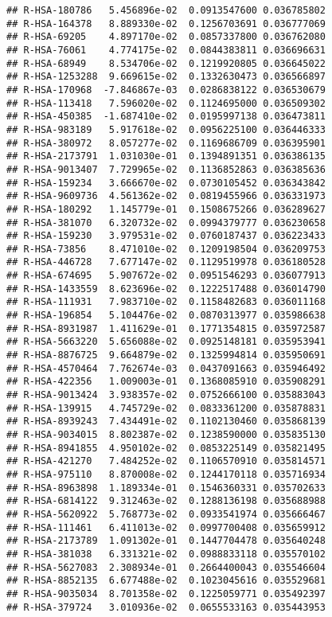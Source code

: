 \documentclass[
]{article}
\begin{document}
\begin{verbatim}
## R-HSA-180786   5.456896e-02  0.0913547600 0.036785802
## R-HSA-164378   8.889330e-02  0.1256703691 0.036777069
## R-HSA-69205    4.897170e-02  0.0857337800 0.036762080
## R-HSA-76061    4.774175e-02  0.0844383811 0.036696631
## R-HSA-68949    8.534706e-02  0.1219920805 0.036645022
## R-HSA-1253288  9.669615e-02  0.1332630473 0.036566897
## R-HSA-170968  -7.846867e-03  0.0286838122 0.036530679
## R-HSA-113418   7.596020e-02  0.1124695000 0.036509302
## R-HSA-450385  -1.687410e-02  0.0195997138 0.036473811
## R-HSA-983189   5.917618e-02  0.0956225100 0.036446333
## R-HSA-380972   8.057277e-02  0.1169686709 0.036395901
## R-HSA-2173791  1.031030e-01  0.1394891351 0.036386135
## R-HSA-9013407  7.729965e-02  0.1136852863 0.036385636
## R-HSA-159234   3.666670e-02  0.0730105452 0.036343842
## R-HSA-9609736  4.561362e-02  0.0819455966 0.036331973
## R-HSA-180292   1.145779e-01  0.1508675266 0.036289627
## R-HSA-381070   6.320732e-02  0.0994379777 0.036230658
## R-HSA-159230   3.979531e-02  0.0760187437 0.036223433
## R-HSA-73856    8.471010e-02  0.1209198504 0.036209753
## R-HSA-446728   7.677147e-02  0.1129519978 0.036180528
## R-HSA-674695   5.907672e-02  0.0951546293 0.036077913
## R-HSA-1433559  8.623696e-02  0.1222517488 0.036014790
## R-HSA-111931   7.983710e-02  0.1158482683 0.036011168
## R-HSA-196854   5.104476e-02  0.0870313977 0.035986638
## R-HSA-8931987  1.411629e-01  0.1771354815 0.035972587
## R-HSA-5663220  5.656088e-02  0.0925148181 0.035953941
## R-HSA-8876725  9.664879e-02  0.1325994814 0.035950691
## R-HSA-4570464  7.762674e-03  0.0437091663 0.035946492
## R-HSA-422356   1.009003e-01  0.1368085910 0.035908291
## R-HSA-9013424  3.938357e-02  0.0752666100 0.035883043
## R-HSA-139915   4.745729e-02  0.0833361200 0.035878831
## R-HSA-8939243  7.434491e-02  0.1102130460 0.035868139
## R-HSA-9034015  8.802387e-02  0.1238590000 0.035835130
## R-HSA-8941855  4.950102e-02  0.0853225149 0.035821495
## R-HSA-421270   7.484252e-02  0.1106570910 0.035814571
## R-HSA-975110   8.870008e-02  0.1244170118 0.035716934
## R-HSA-8963898  1.189334e-01  0.1546360331 0.035702633
## R-HSA-6814122  9.312463e-02  0.1288136198 0.035688988
## R-HSA-5620922  5.768773e-02  0.0933541974 0.035666467
## R-HSA-111461   6.411013e-02  0.0997700408 0.035659912
## R-HSA-2173789  1.091302e-01  0.1447704478 0.035640248
## R-HSA-381038   6.331321e-02  0.0988833118 0.035570102
## R-HSA-5627083  2.308934e-01  0.2664400043 0.035546604
## R-HSA-8852135  6.677488e-02  0.1023045616 0.035529681
## R-HSA-9035034  8.701358e-02  0.1225059771 0.035492397
## R-HSA-379724   3.010936e-02  0.0655533163 0.035443953

\end{verbatim}
\end{document}
